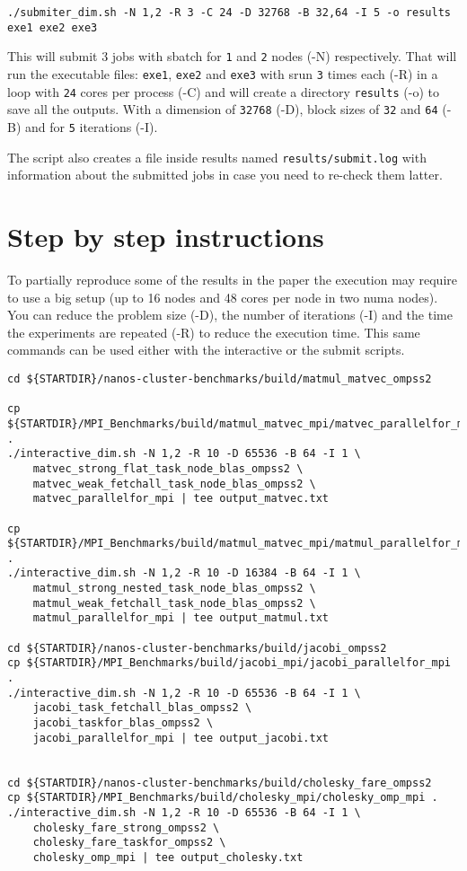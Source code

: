 \documentclass{article}
\newcommand{\code}[1]{\texttt{#1}}
\begin{document}
\begin{lstlisting}
./submiter_dim.sh -N 1,2 -R 3 -C 24 -D 32768 -B 32,64 -I 5 -o results exe1 exe2 exe3
\end{lstlisting}

This will submit 3 jobs with sbatch for \code{1} and \code{2} nodes
(-N) respectively. That will run the executable files: \code{exe1},
\code{exe2} and \code{exe3} with srun \code{3} times each (-R) in a
loop with \code{24} cores per process (-C) and will create a directory
\code{results} (-o) to save all the outputs. With a dimension of
\code{32768} (-D), block sizes of \code{32} and \code{64} (-B) and for
\code{5} iterations (-I).

The script also creates a file inside results named
\code{results/submit.log} with information about the submitted jobs in
case you need to re-check them latter.

\section{Step by step instructions}

To partially reproduce some of the results in the paper the execution
may require to use a big setup (up to 16 nodes and 48 cores per node
in two numa nodes). You can reduce the problem size (-D), the number
of iterations (-I) and the time the experiments are repeated (-R) to
reduce the execution time. This same commands can be used either with
the interactive or the submit scripts.

\begin{lstlisting}
cd ${STARTDIR}/nanos-cluster-benchmarks/build/matmul_matvec_ompss2

cp ${STARTDIR}/MPI_Benchmarks/build/matmul_matvec_mpi/matvec_parallelfor_mpi .
./interactive_dim.sh -N 1,2 -R 10 -D 65536 -B 64 -I 1 \
	matvec_strong_flat_task_node_blas_ompss2 \
	matvec_weak_fetchall_task_node_blas_ompss2 \
	matvec_parallelfor_mpi | tee output_matvec.txt

cp ${STARTDIR}/MPI_Benchmarks/build/matmul_matvec_mpi/matmul_parallelfor_mpi .
./interactive_dim.sh -N 1,2 -R 10 -D 16384 -B 64 -I 1 \
	matmul_strong_nested_task_node_blas_ompss2 \
	matmul_weak_fetchall_task_node_blas_ompss2 \
	matmul_parallelfor_mpi | tee output_matmul.txt

cd ${STARTDIR}/nanos-cluster-benchmarks/build/jacobi_ompss2
cp ${STARTDIR}/MPI_Benchmarks/build/jacobi_mpi/jacobi_parallelfor_mpi .
./interactive_dim.sh -N 1,2 -R 10 -D 65536 -B 64 -I 1 \
	jacobi_task_fetchall_blas_ompss2 \
	jacobi_taskfor_blas_ompss2 \
	jacobi_parallelfor_mpi | tee output_jacobi.txt


cd ${STARTDIR}/nanos-cluster-benchmarks/build/cholesky_fare_ompss2
cp ${STARTDIR}/MPI_Benchmarks/build/cholesky_mpi/cholesky_omp_mpi .
./interactive_dim.sh -N 1,2 -R 10 -D 65536 -B 64 -I 1 \
	cholesky_fare_strong_ompss2 \
	cholesky_fare_taskfor_ompss2 \
	cholesky_omp_mpi | tee output_cholesky.txt

\end{lstlisting}
\end{document}
